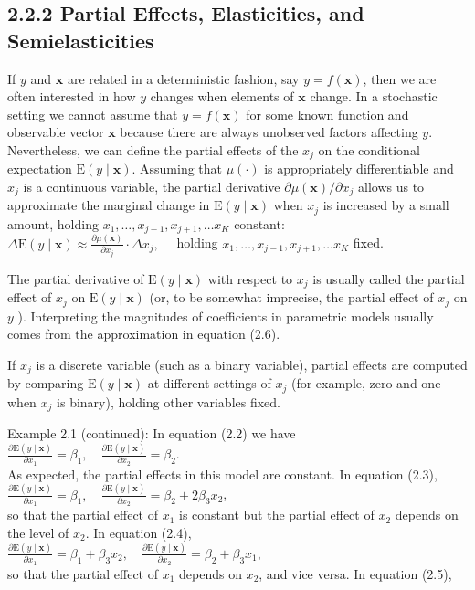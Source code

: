 \documentclass[10pt]{article}
\begin{document}
\subsection*{2.2.2 Partial Effects, Elasticities, and Semielasticities}
If $y$ and $\mathbf{x}$ are related in a deterministic fashion, say $y=f(\mathbf{x})$, then we are often interested in how $y$ changes when elements of $\mathbf{x}$ change. In a stochastic setting we cannot assume that $y=f(\mathbf{x})$ for some known function and observable vector $\mathbf{x}$ because there are always unobserved factors affecting $y$. Nevertheless, we can define the partial effects of the $x_{j}$ on the conditional expectation $\mathrm{E}(y \mid \mathbf{x})$. Assuming that $\mu(\cdot)$ is appropriately differentiable and $x_{j}$ is a continuous variable, the partial derivative $\partial \mu(\mathbf{x}) / \partial x_{j}$ allows us to approximate the marginal change in $\mathrm{E}(y \mid \mathbf{x})$ when $x_{j}$ is increased by a small amount, holding $x_{1}, \ldots, x_{j-1}, x_{j+1}, \ldots x_{K}$ constant:\\
$\Delta \mathrm{E}(y \mid \mathbf{x}) \approx \frac{\partial \mu(\mathbf{x})}{\partial x_{j}} \cdot \Delta x_{j}, \quad$ holding $x_{1}, \ldots, x_{j-1}, x_{j+1}, \ldots x_{K}$ fixed.

The partial derivative of $\mathrm{E}(y \mid \mathbf{x})$ with respect to $x_{j}$ is usually called the partial effect of $x_{j}$ on $\mathrm{E}(y \mid \mathbf{x})$ (or, to be somewhat imprecise, the partial effect of $x_{j}$ on $y$ ). Interpreting the magnitudes of coefficients in parametric models usually comes from the approximation in equation (2.6).

If $x_{j}$ is a discrete variable (such as a binary variable), partial effects are computed by comparing $\mathrm{E}(y \mid \mathbf{x})$ at different settings of $x_{j}$ (for example, zero and one when $x_{j}$ is binary), holding other variables fixed.

Example 2.1 (continued): In equation (2.2) we have\\
$\frac{\partial \mathrm{E}(y \mid \mathbf{x})}{\partial x_{1}}=\beta_{1}, \quad \frac{\partial \mathrm{E}(y \mid \mathbf{x})}{\partial x_{2}}=\beta_{2}$.\\
As expected, the partial effects in this model are constant. In equation (2.3),\\
$\frac{\partial \mathrm{E}(y \mid \mathbf{x})}{\partial x_{1}}=\beta_{1}, \quad \frac{\partial \mathrm{E}(y \mid \mathbf{x})}{\partial x_{2}}=\beta_{2}+2 \beta_{3} x_{2}$,\\
so that the partial effect of $x_{1}$ is constant but the partial effect of $x_{2}$ depends on the level of $x_{2}$. In equation (2.4),\\
$\frac{\partial \mathrm{E}(y \mid \mathbf{x})}{\partial x_{1}}=\beta_{1}+\beta_{3} x_{2}, \quad \frac{\partial \mathrm{E}(y \mid \mathbf{x})}{\partial x_{2}}=\beta_{2}+\beta_{3} x_{1}$,\\
so that the partial effect of $x_{1}$ depends on $x_{2}$, and vice versa. In equation (2.5),
\end{document}
